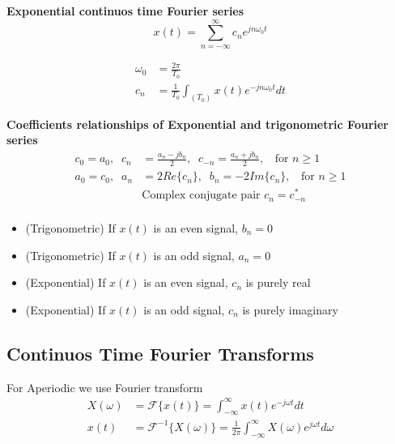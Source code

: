 \textbf{Exponential continuos time Fourier series}
\begin{equation*}
    x(t) = \sum_{n=-\infty}^{\infty} c_n e^{jn\omega_0t}
\end{equation*}

\begin{align*}
    \omega_0 &= \frac{2\pi}{T_0} \\
    c_n &= \frac{1}{T_0}\int_{(T_0)} x(t)e^{-jn\omega_0t} dt
\end{align*}


\textbf{Coefficients relationships of Exponential and trigonometric Fourier series}
\begin{align*}
    c_0=a_0, \;\; c_n&= \frac{a_n-jb_n}{2}, \;\; c_{-n}=\frac{a_n+jb_n}{2}, \;\; 
    \text{ for } n\geq 1 \\
    a_0=c_0, \;\; a_n&= 2Re\{c_n\}, \;\; b_{n}= -2Im\{c_n\}, \;\; 
    \text{ for } n\geq 1 \\
    &\text{Complex conjugate pair } c_n = c^*_{-n} \\
\end{align*}

\begin{itemize}
    \item (Trigonometric) If $x(t)$ is an even signal, $b_n=0$
    \item (Trigonometric) If $x(t)$ is an odd signal, $a_n=0$
    \item (Exponential) If $x(t)$ is an even signal, $c_n$ is purely real
    \item (Exponential) If $x(t)$ is an odd signal, $c_n$ is purely imaginary
\end{itemize}


\subsection{Continuos Time Fourier Transforms}
For Aperiodic we use Fourier transform
\begin{align*}
    X(\omega) &= \mathcal{F}\{x(t)\} = \int_{-\infty}^{\infty} x(t) e^{-j\omega t} dt \\
    x(t) &= \mathcal{F}^{-1}\{X(\omega)\} = \frac{1}{2\pi} \int_{-\infty}^{\infty} X(\omega) 
    e^{j\omega t} d\omega \\
\end{align*}

